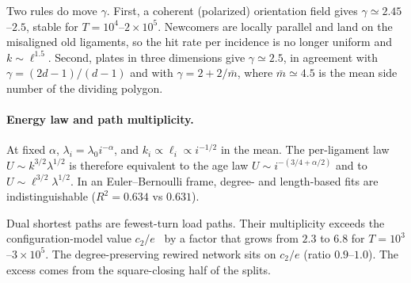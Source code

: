 Two rules do move $\gamma$. First, a coherent (polarized) orientation field
gives $\gamma\simeq2.45$--$2.5$, stable for $T=10^4$--$2\times10^5$.
Newcomers are locally parallel and land on the misaligned old ligaments, so the
hit rate per incidence is no longer uniform and $k\sim\ell^{1.5}$. Second,
plates in three dimensions give $\gamma\simeq2.5$, in agreement with
$\gamma=(2d-1)/(d-1)$ and with $\gamma=2+2/\bar m$, where $\bar m\simeq4.5$ is
the mean side number of the dividing polygon.

\paragraph{Energy law and path multiplicity.}
At fixed $\alpha$, $\lambda_i=\lambda_0i^{-\alpha}$, and $k_i\propto\ell_i\propto
i^{-1/2}$ in the mean. The per-ligament law $U\sim k^{3/2}\lambda^{1/2}$ is
therefore equivalent to the age law $U\sim i^{-(3/4+\alpha/2)}$ and to
$U\sim\ell^{3/2}\lambda^{1/2}$. In an Euler--Bernoulli frame, degree- and
length-based fits are indistinguishable ($R^2=0.634$ vs $0.631$).

Dual shortest paths are fewest-turn load paths. Their multiplicity exceeds the
configuration-model value $c_2/e$~\cite{vazquez2026multiplicity} by a factor
that grows from $2.3$ to $6.8$ for $T=10^3$--$3\times10^5$. The degree-preserving
rewired network sits on $c_2/e$ (ratio $0.9$--$1.0$). The excess comes from
the square-closing half of the splits.

